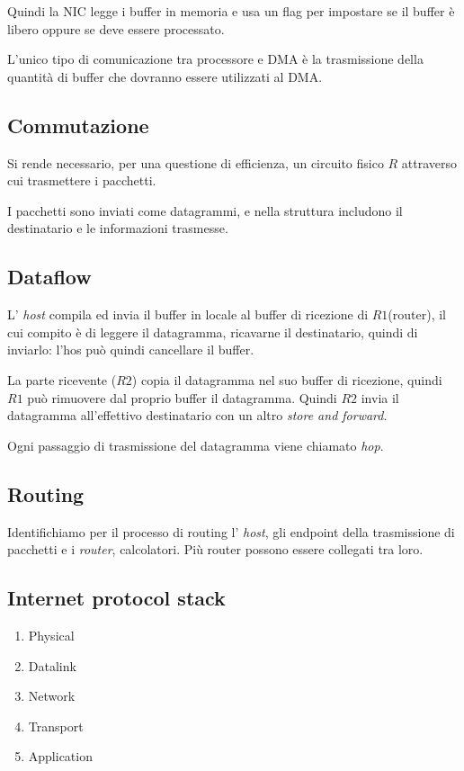 Quindi la NIC legge i buffer in memoria e usa un flag per impostare se il
buffer è libero oppure se deve essere processato.

L'unico tipo di comunicazione tra processore e DMA è la trasmissione della 
quantità di buffer che dovranno essere utilizzati al DMA.

\subsection{Commutazione}
Si rende necessario, per una questione di efficienza, un circuito fisico $R$
attraverso cui trasmettere i pacchetti.

I pacchetti sono inviati come datagrammi, e nella struttura includono il
destinatario e le informazioni trasmesse.

\subsection{Dataflow}
L' \emph{host} compila ed invia il buffer in locale al buffer di ricezione di
$R1$(router), il cui compito è di leggere il datagramma, ricavarne il
destinatario, quindi di inviarlo: l'hos può quindi cancellare il buffer.

La parte ricevente ($R2$) copia il datagramma nel suo buffer di ricezione,
quindi $R1$ può rimuovere dal proprio buffer il datagramma.
Quindi $R2$ invia il datagramma all'effettivo destinatario con un altro
\emph{store and forward}.

Ogni passaggio di trasmissione del datagramma viene chiamato \emph{hop}.

\subsection{Routing}
Identifichiamo per il processo di routing l' \emph{host}, gli endpoint della
trasmissione di pacchetti e i \emph{router}, calcolatori.
Più router possono essere collegati tra loro.

\subsection{Internet protocol stack}
\begin{enumerate}
  \item Physical
  \item Datalink
  \item Network
  \item Transport
  \item Application
\end{enumerate}

